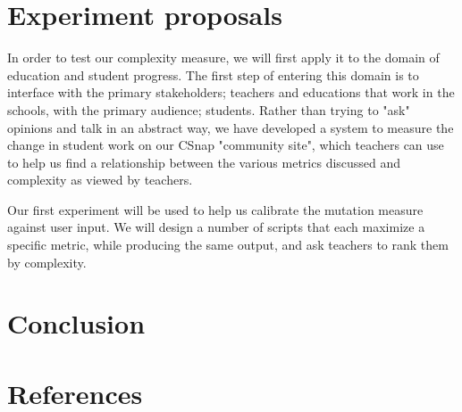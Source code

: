 \documentclass[]{article}
\begin{document}
\section{Experiment proposals}


In order to test our complexity measure, we will first apply it to the domain of education and student progress.
The first step of entering this domain is to interface with the primary stakeholders; teachers and educations that work in the schools, with the primary audience; students.
Rather than trying to "ask" opinions and talk in an abstract way, we have developed a system to measure the change in student work on our CSnap "community site", which teachers can use to help us find a relationship between the various metrics discussed and complexity as viewed by teachers.

Our first experiment will be used to help us calibrate the mutation measure against user input.
We will design a number of scripts that each maximize a specific metric, while producing the same output, and ask teachers to rank them by complexity.



\section{Conclusion}
\section{References}

\printbibliography
\end{document}
